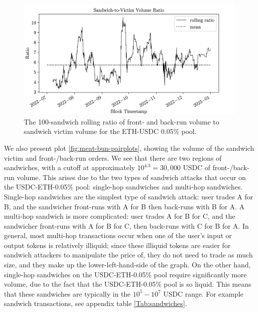         \begin{figure}
            \centering
            \includegraphics[scale=.40]{figs/bun-to-meat-ratio.png}
            \caption{The 100-sandwich rolling ratio of front- and back-run volume to sandwich victim volume for the ETH-USDC 0.05\% pool.}
            \label{fig:meat-bun-ratio}
        \end{figure}

        We also present plot \ref{fig:meat-bun-pairplots}, showing the volume of the sandwich victim and front-/back-run orders. We see that there are two regions of sandwiches, with a cutoff at approximately $10^{4.3}=30,000$ USDC of front-/back-run volume.
        This arises due to the two types of sandwich attacks that occur on the USDC-ETH-0.05\% pool: single-hop sandwiches and multi-hop sandwiches. Single-hop sandwiches are the simplest type of sandwich attack: user trades A for B, and the sandwicher front-runs with A for B then back-runs with B for A. A multi-hop sandwich is more complicated: user trades A for B for C, and the sandwicher front-runs with A for B for C, then back-runs with C for B for A. In general, most multi-hop transactions occur when one of the user's input or output tokens is relatively illiquid; since these illiquid tokens are easier for sandwich attackers to manipulate the price of, they do not need to trade as much size, and they make up the lower-left-hand-side of the graph. On the other hand, single-hop sandwiches on the USDC-ETH-0.05\% pool require significantly more volume, due to the fact that the USDC-ETH-0.05\% pool is so liquid. This means that these sandwiches are typically in the $10^5-10^7$ USDC range.
        For example sandwich transactions, see appendix table \ref{Tab:sandwiches}.


